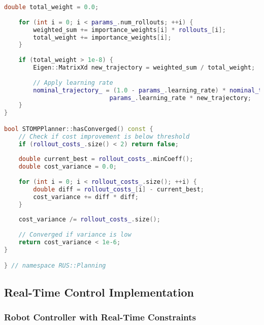 \begin{lstlisting}[language=C++, caption={STOMP Path Planning Algorithm}, label={lst:app-stomp}]
    double total_weight = 0.0;
    
    for (int i = 0; i < params_.num_rollouts; ++i) {
        weighted_sum += importance_weights[i] * rollouts_[i];
        total_weight += importance_weights[i];
    }
    
    if (total_weight > 1e-8) {
        Eigen::MatrixXd new_trajectory = weighted_sum / total_weight;
        
        // Apply learning rate
        nominal_trajectory_ = (1.0 - params_.learning_rate) * nominal_trajectory_ + 
                             params_.learning_rate * new_trajectory;
    }
}

bool STOMPPlanner::hasConverged() const {
    // Check if cost improvement is below threshold
    if (rollout_costs_.size() < 2) return false;
    
    double current_best = rollout_costs_.minCoeff();
    double cost_variance = 0.0;
    
    for (int i = 0; i < rollout_costs_.size(); ++i) {
        double diff = rollout_costs_[i] - current_best;
        cost_variance += diff * diff;
    }
    
    cost_variance /= rollout_costs_.size();
    
    // Converged if variance is low
    return cost_variance < 1e-6;
}

} // namespace RUS::Planning
\end{lstlisting}

\subsection{Real-Time Control Implementation}

\subsubsection{Robot Controller with Real-Time Constraints}


